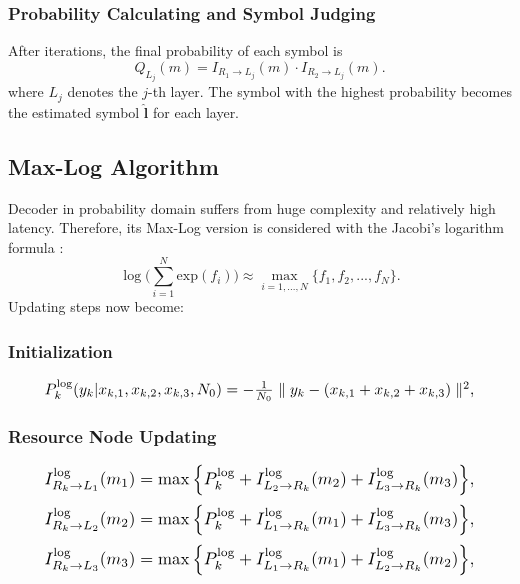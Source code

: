 \documentclass[journal,twoside]{IEEEtran}
\begin{document}
\subsubsection{Probability Calculating and Symbol Judging}
After iterations, the final probability of each symbol is
\begin{equation}
\label{eqn:8}
Q_{L_{j}}(m) = I_{R_{1}\rightarrow L_{j}}(m)\cdot I_{R_{2}\rightarrow L_{j}}(m).
\end{equation}
where $L_{j}$ denotes the $j$-th layer. The symbol with the highest probability becomes the estimated symbol $\bm{\hat{l}}$ for each layer.

\subsection{Max-Log Algorithm}
Decoder in probability domain suffers from huge complexity and relatively high latency. Therefore, its Max-Log version is considered \cite{chen2005reduced} with the Jacobi's logarithm formula \cite{robertson1995comparison}:
\begin{equation}
\label{eqn:jacobi}
\log \Bigg( \sum_{i=1}^{N}\mathrm{exp}(f_{i}) \Bigg) \approx \max_{i=1,...,N}\{f_{1},f_{2},...,f_{N}\}.
\end{equation}
Updating steps now become:
\subsubsection{Initialization}
\begin{equation}
\label{equ:log1}
\resizebox{.89\linewidth}{!}{$
P_{k}^{\log}(y_{k}|x_{k,1},x_{k,2},x_{k,3},N_{0}) = -\frac{1}{N_{0}}\parallel y_{k}-(x_{k,1}+x_{k,2}+x_{k,3})\parallel^{2},
$}
\end{equation}
\subsubsection{Resource Node Updating}
\begin{equation}
\label{eqn:log2}
\resizebox{.89\linewidth}{!}{$
I_{R_{k}\rightarrow L_{1}}^{\log}(m_{1}) = \max \Big\{P_{k}^{\log}+I_{L_{2}\rightarrow R_{k}}^{\log}(m_{2})+I_{L_{3}\rightarrow R_{k}}^{\log}(m_{3})\Big\},
$}
\end{equation}
\begin{equation}
\label{eqn:log3}
\resizebox{.89\linewidth}{!}{$
I_{R_{k}\rightarrow L_{2}}^{\log}(m_{2}) = \max \Big\{P_{k}^{\log}+I_{L_{1}\rightarrow R_{k}}^{\log}(m_{1})+I_{L_{3}\rightarrow R_{k}}^{\log}(m_{3})\Big\},
$}
\end{equation}
\begin{equation}
\label{eqn:log4}
\resizebox{.89\linewidth}{!}{$
I_{R_{k}\rightarrow L_{3}}^{\log}(m_{3}) = \max \Big\{P_{k}^{\log}+I_{L_{1}\rightarrow R_{k}}^{\log}(m_{1})+I_{L_{2}\rightarrow R_{k}}^{\log}(m_{2})\Big\},
$}
\end{equation}
\end{document}
